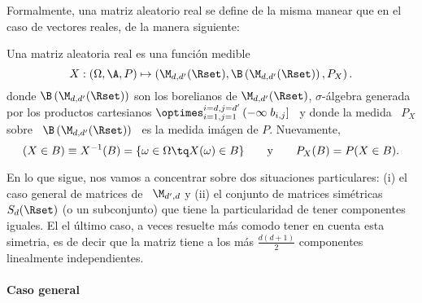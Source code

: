 Formalmente, una  matriz aleatorio real se define  de la misma manear  que en el
caso de vectores reales, de la manera siguiente:
%
\begin{definicion}
\label{Def:MP:MatrizAleatorioaReal}
%
  Una matriz aleatoria real es una funci\'on medible
  \[
  X:  (\Omega,\A,P) \mapsto  \left( \M_{d,d'}(\Rset)  ,  \B\left( \M_{d,d'}(\Rset)
    \right) , P_X \right).
  \]
  donde   $\B\left(    \M_{d,d'}(\Rset)   \right)$   son    los   borelianos   de
  $\M_{d,d'}(\Rset)$, $\sigma$-\'algebra  generada por los  productos cartesianos
  $\optimes_{i=1,j=1}^{i=d,j=d'}  \left( -\infty \;  b_{i,j} \right]$  \ y
  donde la  medida \ $P_X$  sobre \ $\B\left(  \M_{d,d'}(\Rset) \right)$ \  es la
  medida im\'agen de $P$. Nuevamente,
  \[
  (X \in  B) \equiv  X^{-1}(B) =  \{ \omega \in  \Omega \tq  X(\omega) \in  B \}
  \qquad \mbox{y} \qquad P_X(B) = P(X \in B).
  \]
\end{definicion}

En lo que sigue, nos vamos  a concentrar sobre dos situaciones particulares: (i)
el  caso general de  matrices de  \ $\M_{d',d}$  y (ii)  el conjunto  de matrices
sim\'etricas  $S_d(\Rset)$ (o  un subconjunto)  que tiene  la  particularidad de
tener componentes  iguales. El el \'ultimo  caso, a veces  resuelte m\'as comodo
tener en  cuenta esta  simetria, es  de decir que  la matriz  tiene a  los m\'as
$\frac{d (d+1)}{2}$ componentes linealmente independientes.




\paragraph{Caso general}

